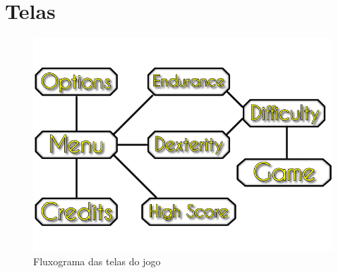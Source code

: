 \section{Telas} 

\begin{figure}[H]
\centering\includegraphics[scale=2.0]{figuras/fluxo_telas.png}
\caption{Fluxograma das telas do jogo}
\end{figure}
